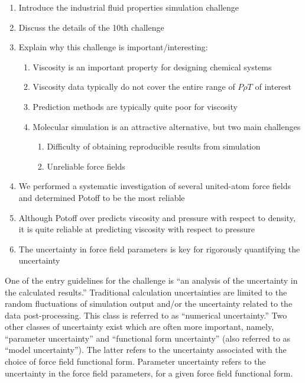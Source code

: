 \documentclass[preprint,review,12pt]{elsarticle}
\begin{document}
	\begin{enumerate}
		\item Introduce the industrial fluid properties simulation challenge
		\item Discuss the details of the 10th challenge
		\item Explain why this challenge is important/interesting:
		\begin{enumerate}
			\item Viscosity is an important property for designing chemical systems
			\item Viscosity data typically do not cover the entire range of $P \rho T$ of interest
			\item Prediction methods are typically quite poor for viscosity
			\item Molecular simulation is an attractive alternative, but two main challenges
			\begin{enumerate}
				\item Difficulty of obtaining reproducible results from simulation
				\item Unreliable force fields
			\end{enumerate}
		\end{enumerate}
		\item We performed a systematic investigation of several united-atom force fields and determined Potoff to be the most reliable
		\item Although Potoff over predicts viscosity and pressure with respect to density, it is quite reliable at predicting viscosity with respect to pressure
		\item The uncertainty in force field parameters is key for rigorously quantifying the uncertainty
	\end{enumerate}
	
	One of the entry guidelines for the challenge is ``an analysis of the uncertainty in the calculated results.'' Traditional calculation uncertainties are limited to the random fluctuations of simulation output and/or the uncertainty related to the data post-processing. This class is referred to as ``numerical uncertainty.'' Two other classes of uncertainty exist which are often more important, namely, ``parameter uncertainty'' and ``functional form uncertainty'' (also referred to as ``model uncertainty''). The latter refers to the uncertainty associated with the choice of force field functional form. Parameter uncertainty refers to the uncertainty in the force field parameters, for a given force field functional form. 
	
\end{document}
